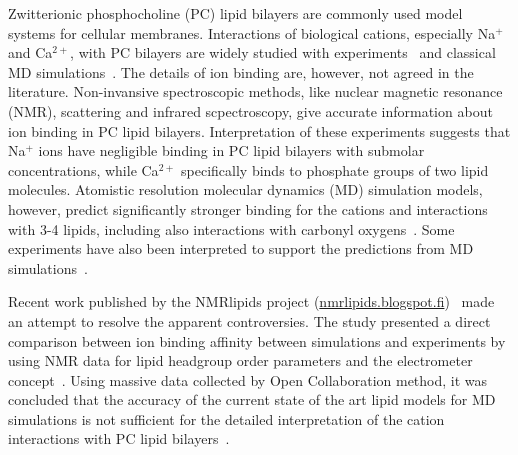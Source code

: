 \documentclass[aip,jcp,twocolumn]{revtex4}
\begin{document}
Zwitterionic phosphocholine (PC) lipid bilayers are commonly used model systems for
cellular membranes. Interactions of biological cations, especially Na$^+$ and
Ca$^{2+}$, with PC bilayers are widely studied with
experiments~\cite{akutsu81,altenbach84,seelig90,cevc90,tocanne90,binder02,pabst07,uhrikova08}
and classical MD simulations~\cite{bockmann03,bockmann04,Berkowitz12,melcrova16,javanainen17}.
The details of ion binding are, however, not agreed in the literature.
Non-invansive spectroscopic methods, like nuclear magnetic resonance (NMR), scattering
and infrared scpectroscopy, give accurate information about ion binding
in PC lipid bilayers\cite{hauser76,hauser78,herbette84,akutsu81,altenbach84,binder02,pabst07,uhrikova08}.
Interpretation of these experiments suggests that Na$^+$ ions have
negligible binding in PC lipid bilayers with submolar concentrations, while Ca$^{2+}$ specifically
binds to phosphate groups of two lipid molecules. Atomistic resolution
molecular dynamics (MD) simulation models, however, predict significantly
stronger binding for the cations and interactions with 3-4 lipids,
including also interactions with carbonyl
oxygens~\cite{bockmann03,bockmann04,melcrova16,javanainen17}.
Some experiments have also been interpreted to support the predictions from
MD simulations~\cite{bockmann03,vacha09a}. 

Recent work published by the NMRlipids project (\url{nmrlipids.blogspot.fi})~\cite{catte16}
made an attempt to resolve the apparent controversies. The study presented 
a direct comparison between ion binding affinity between simulations and
experiments by using NMR data for lipid headgroup order 
parameters and the electrometer concept~\cite{seelig87}.
Using massive data collected by Open Collaboration method, it was concluded
that the accuracy of the current state of the art lipid models for MD
simulations is not sufficient for the detailed interpretation of the cation
interactions with PC lipid bilayers~\cite{catte16}.

\end{document}
